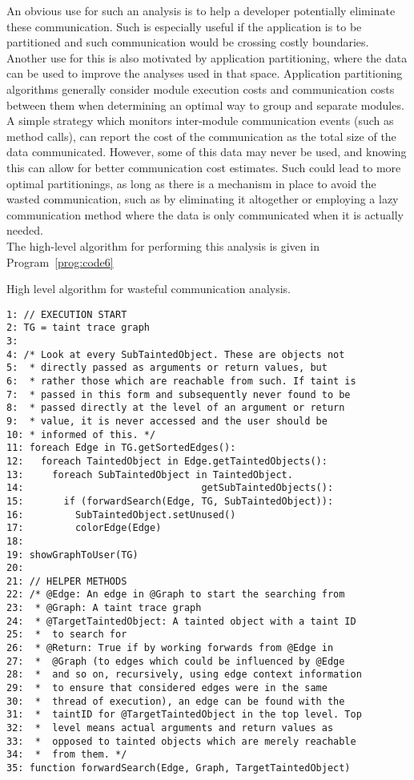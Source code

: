\documentclass[msc,oneside]{ubcthesis}
\begin{document}
An obvious use for such an analysis is to help a developer potentially eliminate these communication. Such is especially useful if the application is to be partitioned and such communication would be crossing costly boundaries. Another use for this is also motivated by application partitioning, where the data can be used to improve the analyses used in that space. Application partitioning algorithms generally consider module execution costs and communication costs between them when determining an optimal way to group and separate modules. A simple strategy which monitors inter-module communication events (such as method calls), can report the cost of the communication as the total size of the data communicated. However, some of this data may never be used, and knowing this can allow for better communication cost estimates. Such could lead to more optimal partitionings, as long as there is a mechanism in place to avoid the wasted communication, such as by eliminating it altogether or employing a lazy communication method where the data is only communicated when it is actually needed.\\

The high-level algorithm for performing this analysis is given in Program~\ref{prog:code6}

\begin{Program}
  \caption{\label{prog:code6} High level algorithm for wasteful communication analysis.}
\begin{verbatim}			
1: // EXECUTION START
2: TG = taint trace graph
3: 
4: /* Look at every SubTaintedObject. These are objects not 
5:  * directly passed as arguments or return values, but 
6:  * rather those which are reachable from such. If taint is 
7:  * passed in this form and subsequently never found to be 
8:  * passed directly at the level of an argument or return 
9:  * value, it is never accessed and the user should be 
10: * informed of this. */   
11: foreach Edge in TG.getSortedEdges():
12:   foreach TaintedObject in Edge.getTaintedObjects():
13:     foreach SubTaintedObject in TaintedObject.
14:                               getSubTaintedObjects():
15:       if (forwardSearch(Edge, TG, SubTaintedObject)):
16:         SubTaintedObject.setUnused()
17:         colorEdge(Edge)
18:         
19: showGraphToUser(TG)
20: 
21: // HELPER METHODS
22: /* @Edge: An edge in @Graph to start the searching from
23:  * @Graph: A taint trace graph
24:  * @TargetTaintedObject: A tainted object with a taint ID
25:  *  to search for
26:  * @Return: True if by working forwards from @Edge in 
27:  *  @Graph (to edges which could be influenced by @Edge
28:  *  and so on, recursively, using edge context information
29:  *  to ensure that considered edges were in the same 
30:  *  thread of execution), an edge can be found with the 
31:  *  taintID for @TargetTaintedObject in the top level. Top
32:  *  level means actual arguments and return values as 
33:  *  opposed to tainted objects which are merely reachable 
34:  *  from them. */  
35: function forwardSearch(Edge, Graph, TargetTaintedObject)
\end{verbatim}
\end{Program}
\end{document}
